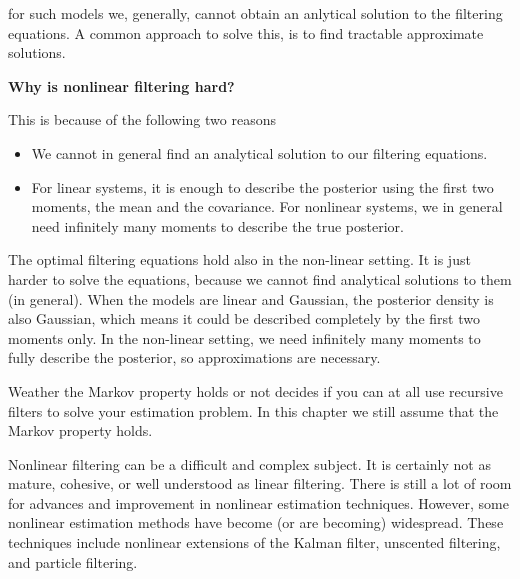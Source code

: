 for such models we, generally, cannot obtain an anlytical solution to the filtering equations. A common approach to solve this, is to find tractable approximate solutions.


\begin{framed}
\theoremstyle{remark}
\begin{remark}{\textbf{Why is nonlinear filtering hard?}}

This is because of the following two reasons

\begin{itemize}
\item We cannot in general find an analytical solution to our filtering equations.
\item For linear systems, it is enough to describe the posterior using the first two moments, the mean and the covariance. For nonlinear systems, 
we in general need infinitely many moments to describe the true posterior.
\end{itemize}

The optimal filtering equations hold also in the non-linear setting. It is just harder to solve the equations, because we cannot find 
analytical solutions to them (in general). When the models are linear and Gaussian, the posterior density 
is also Gaussian, which means it could be described completely by the first two moments only. 
In the non-linear setting, we need infinitely many moments to fully describe the posterior, so approximations are necessary.

Weather the Markov property holds or not decides if you can at all use recursive filters to solve your estimation problem. 
In this chapter we still assume that the Markov property holds.
\end{remark}
\end{framed} 

Nonlinear filtering can be a difficult and complex subject.  It is certainly not as 
mature, cohesive, or well understood  as linear filtering. There is still a lot of  room 
for advances and improvement in nonlinear estimation techniques.  However, some 
nonlinear  estimation methods have become  (or are becoming) widespread.  These 
techniques  include nonlinear  extensions of  the Kalman filter,  unscented  filtering, 
and particle filtering. 



